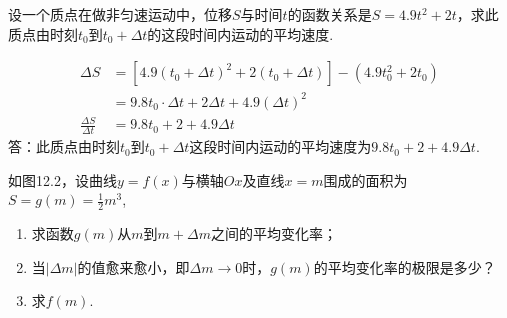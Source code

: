 \begin{example}
设一个质点在做非匀速运动中，位移$S$与时间$t$的函数关系是$S=4.9t^2+2t$，求此质点由时刻$t_0$到$t_0+\Delta t$的这段时间内运动的平均速度.
\end{example}

\begin{solution}
\[\begin{split}
    \Delta S&=[4.9(t_0+\Delta t)^2+2(t_0+\Delta t)]-(4.9t^2_0+2t_0)\\
&=9.8t_0\cdot \Delta t+2\Delta t+4.9(\Delta t)^2\\
\frac{\Delta S}{\Delta t}&=9.8t_0+2+4.9\Delta t
\end{split}\]
答：此质点由时刻$t_0$到$t_0+\Delta t$这段时间内运动的平均速度为$9.8t_0+2+4.9\Delta t$.
\end{solution}

\noindent
\begin{minipage}{.52\textwidth}
    \begin{example}
        如图12.2，设曲线$y=f(x)$与横轴$Ox$及直线$x=m$围成的面积为$S=g(m)=\frac{1}{2}m^3$, 
    \begin{enumerate}[(1)]
        \item 求函数$g(m)$从$m$到$m+\Delta m$之间的平均变化率；
        \item 当$|\Delta m|$的值愈来愈小，即$\Delta m\to 0$时，$g(m)$的平均变化率的极限是多少？
        \item 求$f(m)$.
    \end{enumerate}
    \end{example}
\end{minipage}\hfill
\begin{minipage}{.45\textwidth}
\centering
{}
\end{minipage}


